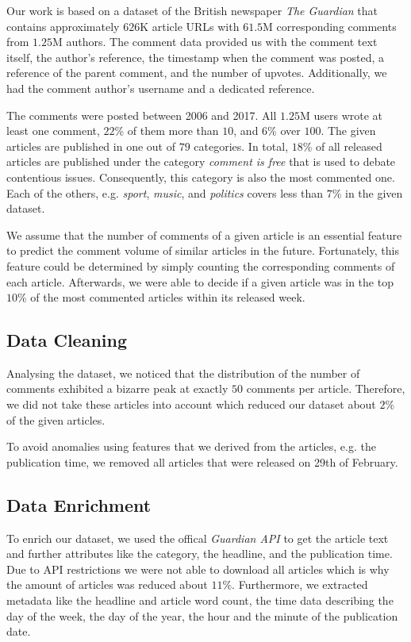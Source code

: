 Our work is based on a dataset of the British newspaper \textit{The Guardian} that contains approximately $626$K article URLs with $61.5$M corresponding comments from $1.25$M authors. 
The comment data provided us with the comment text itself, the author's reference, the timestamp when the comment was posted, a reference of the parent comment, and the number of upvotes. Additionally, we had the comment author's username and a dedicated reference. 

The comments were posted between 2006 and 2017. All $1.25$M users wrote at least one comment, $22$\% of them more than $10$, and $6$\% over $100$.
The given articles are published in one out of $79$ categories. In total, $18$\% of all released articles are published under the category \textit{comment is free} that is used to debate contentious issues. Consequently, this category is also the most commented one. 
Each of the others, e.g. \textit{sport}, \textit{music}, and \textit{politics} covers less than $7$\% in the given dataset.

We assume that the number of comments of a given article is an essential feature to predict the comment volume of similar articles in the future. Fortunately, this feature could be determined by simply counting the corresponding comments of each article. Afterwards, we were able to decide if a given article was in the top $10$\% of the most commented articles within its released week.

\subsection{Data Cleaning}
Analysing the dataset, we noticed that the distribution of the number of comments exhibited a bizarre peak at exactly $50$ comments per article. Therefore, we did not take these articles into account which reduced our dataset about $2$\% of the given articles.

To avoid anomalies using features that we derived from the articles, e.g. the publication time, we removed all articles that were released on 29th of February.

\subsection{Data Enrichment}
To enrich our dataset, we used the offical \textit{Guardian API} to get the article text and further attributes like the category, the headline, and the publication time.
Due to API restrictions we were not able to download all articles which is why the amount of articles was reduced about $11$\%.
Furthermore, we extracted metadata like the headline and article word count, the time data describing the day of the week, the day of the year, the hour and the minute of the publication date.

